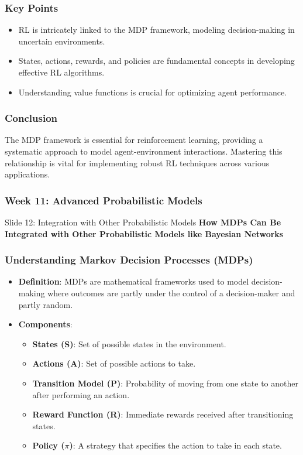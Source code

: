 \documentclass[aspectratio=169]{beamer}
\begin{document}
\begin{frame}[fragile]
    \frametitle{Key Points}
    \begin{itemize}
        \item RL is intricately linked to the MDP framework, modeling decision-making in uncertain environments.
        \item States, actions, rewards, and policies are fundamental concepts in developing effective RL algorithms.
        \item Understanding value functions is crucial for optimizing agent performance.
    \end{itemize}
\end{frame}

\begin{frame}[fragile]
    \frametitle{Conclusion}
    The MDP framework is essential for reinforcement learning, providing a systematic approach to model agent-environment interactions. Mastering this relationship is vital for implementing robust RL techniques across various applications.
\end{frame}

\begin{frame}[fragile]
    \frametitle{Week 11: Advanced Probabilistic Models}
    
    \begin{block}{Slide 12: Integration with Other Probabilistic Models}
        \textbf{How MDPs Can Be Integrated with Other Probabilistic Models like Bayesian Networks}
    \end{block}
\end{frame}

\begin{frame}[fragile]
    \frametitle{Understanding Markov Decision Processes (MDPs)}
    
    \begin{itemize}
        \item \textbf{Definition}: MDPs are mathematical frameworks used to model decision-making where outcomes are partly under the control of a decision-maker and partly random.
        \item \textbf{Components}:
        \begin{itemize}
            \item \textbf{States (S)}: Set of possible states in the environment.
            \item \textbf{Actions (A)}: Set of possible actions to take.
            \item \textbf{Transition Model (P)}: Probability of moving from one state to another after performing an action.
            \item \textbf{Reward Function (R)}: Immediate rewards received after transitioning states.
            \item \textbf{Policy ($\pi$)}: A strategy that specifies the action to take in each state.
        \end{itemize}
    \end{itemize}
\end{frame}
\end{document}
